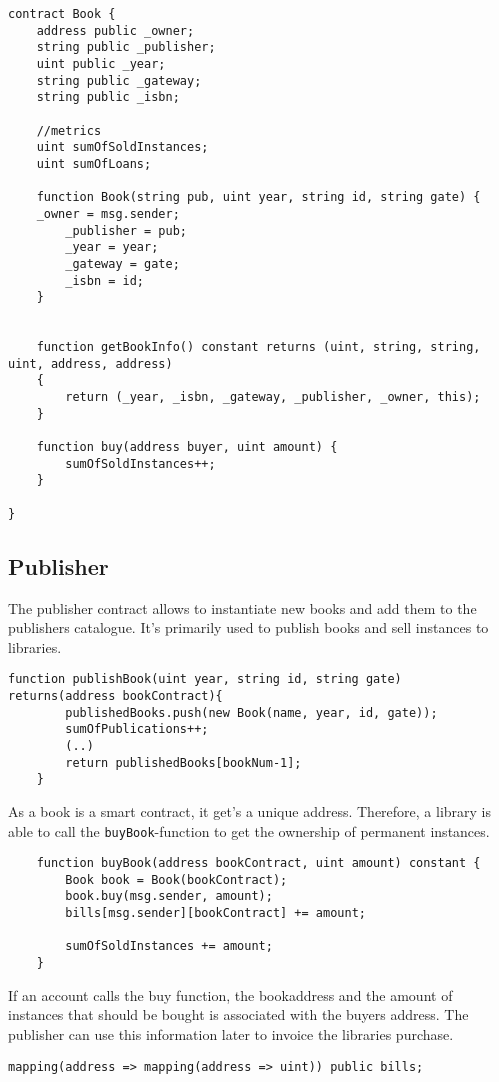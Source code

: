 \begin{lstlisting}
contract Book {
	address public _owner;
	string public _publisher;
	uint public _year;
	string public _gateway;
	string public _isbn;

	//metrics
	uint sumOfSoldInstances;
	uint sumOfLoans;
  
	function Book(string pub, uint year, string id, string gate) {
  	_owner = msg.sender;
		_publisher = pub;
		_year = year;
		_gateway = gate;
		_isbn = id;
	}


	function getBookInfo() constant returns (uint, string, string, uint, address, address)
	{
	 	return (_year, _isbn, _gateway, _publisher, _owner, this);
	}

	function buy(address buyer, uint amount) {
		sumOfSoldInstances++;
	}

}
\end{lstlisting}

\subsection{Publisher}
The publisher contract allows to instantiate new books and add them to the publishers catalogue. It's primarily used to publish books and sell instances to libraries.

\begin{lstlisting}
function publishBook(uint year, string id, string gate) returns(address bookContract){
		publishedBooks.push(new Book(name, year, id, gate));
		sumOfPublications++;
		(..)
		return publishedBooks[bookNum-1];
	}
\end{lstlisting}

As a book is a smart contract, it get's a unique address. Therefore, a library is able to call the \texttt{buyBook}-function to get the ownership of permanent instances.

\begin{lstlisting}
	function buyBook(address bookContract, uint amount) constant {
		Book book = Book(bookContract);
		book.buy(msg.sender, amount);	
		bills[msg.sender][bookContract] += amount;

		sumOfSoldInstances += amount;
	}
\end{lstlisting}

If an account calls the buy function, the bookaddress and the amount of instances that should be bought is associated with the buyers address. The publisher can use this information later to invoice the libraries purchase.

\begin{lstlisting}
mapping(address => mapping(address => uint)) public bills;
\end{lstlisting}


